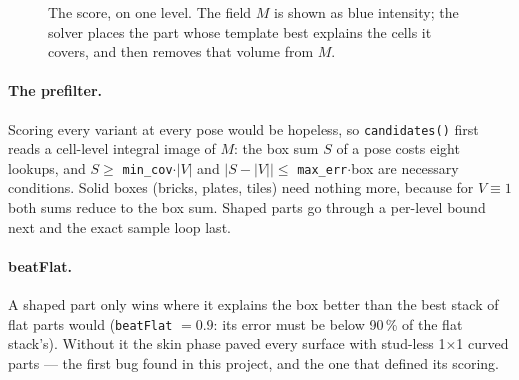 \documentclass[10pt,a4paper]{article}
\newcommand{\code}[1]{\texttt{\small #1}}
\begin{document}
\begin{figure}[h]
\centering
{}
\caption{The score, on one level. The field $M$ is shown as blue intensity; the solver places the part whose template best explains the
cells it covers, and then removes that volume from $M$.}
\end{figure}

\paragraph{The prefilter.} Scoring every variant at every pose would be hopeless, so \code{candidates()} first reads a
cell-level integral image of $M$: the box sum $S$ of a pose costs eight lookups, and $S\ge$ \code{min\_cov}$\cdot|V|$ and
$|S-|V||\le$ \code{max\_err}$\cdot$box are necessary conditions. Solid boxes (bricks, plates, tiles) need nothing more, because
for $V\equiv1$ both sums reduce to the box sum. Shaped parts go through a per-level bound next and the exact sample loop last.

\paragraph{beatFlat.} A shaped part only wins where it explains the box better than the best stack of flat parts would
(\code{beatFlat} $=0.9$: its error must be below 90\,\% of the flat stack's). Without it the skin phase paved every surface with
stud-less 1$\times$1 curved parts --- the first bug found in this project, and the one that defined its scoring.
\end{document}
